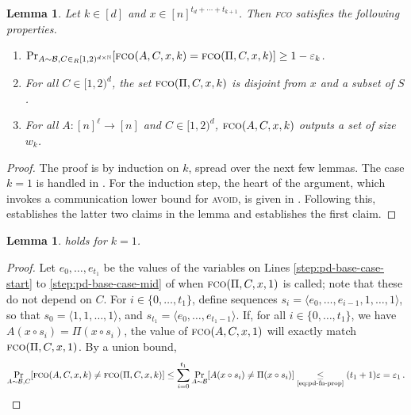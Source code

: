 \documentclass[10pt,a4paper]{article}
\newtheorem{lemma}[theorem]{Lemma}
\theoremstyle{definition}
\theoremstyle{remark}
\newcommand{\NN}{\mathbb{N}}
\newcommand{\cB}{\mathcal{B}}
\let\epsilon\varepsilon
\newcommand{\avoid}{\textsc{avoid}\xspace}
\newcommand{\fco}{\textsc{fco}\xspace}
\newcommand{\rl}{\mathbf{\ell}}             %
\newcommand{\concat}{\mathbin{\circ}}       %
\begin{document}
\begin{itemize}
\begin{itemize}
\begin{lemma}\label{lem:pd-main-recursion}
  Let $k \in [d]$ and $x \in [n]^{t_d + \cdots + t_{k+1}}$. Then \fco
  satisfies the following properties.
  \begin{enumerate}
    \item $\Pr_{A \sim \cB, C \in_R [1,2)^{d \times \NN}}[\fco(A, C, x, k) =
    \fco(\Pi, C, x, k)] \ge 1 - \epsilon_k$.
    \item For all $C \in [1,2)^d$, the set $\fco(\Pi, C, x, k)$ is disjoint from $x$ and a subset of $S$. 
    \item For all $A \colon [n]^\rl \to [n]$ and $C \in [1,2)^d$,
    $\fco(A,C,x,k)$ outputs a set of size $w_k$.
  \end{enumerate}
\end{lemma}
\begin{proof}
  The proof is by induction on $k$, spread over the next few lemmas. The case
  $k = 1$ is handled in . For the induction step, the
  heart of the argument, which invokes a communication lower bound for \avoid, is
  given in . Following this,
   establishes the latter two claims in the lemma
  and  establishes the first claim.
\end{proof}

\begin{lemma}\label{lem:pd-base-case} 
   holds for $k = 1$.
\end{lemma}
%
\begin{proof}%
  Let $e_0,\ldots,e_{t_1}$ be the values of the variables on Lines
  \ref{step:pd-base-case-start} to \ref{step:pd-base-case-mid} of
   when $\fco(\Pi, C, x, 1)$ is called; note that
  these do not depend on $C$. For $i \in \{0,\ldots,t_1\}$, define sequences
  $s_i = \langle e_0,\ldots,e_{i-1},1,\ldots,1 \rangle$, so that $s_0 =
  \langle 1,1,\ldots,1 \rangle$, and $s_{t_1} = \langle e_0,\ldots,e_{t_1-1}
  \rangle$. If, for all $i \in \{0,\ldots,t_1\}$, we have $A(x \concat s_i) =
  \Pi(x \concat s_i)$, the value of $\fco(A, C, x, 1)$ will exactly match
  $\fco(\Pi,C,x,1)$. By a union bound,
  \begin{align*}
    \Pr_{A \sim \cB, C}[\fco(A, C, x, k) \ne \fco(\Pi, C, x, k)] 
    \le \sum_{i = 0}^{t_1} \Pr_{A \sim \cB}[A(x \concat s_i) \ne \Pi(x \concat s_i)] 
    \underset{\text{\cref{eq:pd-fn-prop}}}{\le} (t_1 + 1) \epsilon 
    = \epsilon_1 \,.
  \end{align*}
  

\end{proof}
\end{itemize}
\end{itemize}
\end{document}
